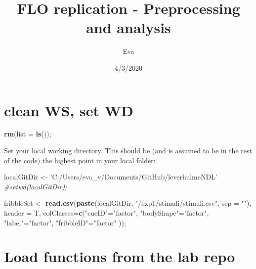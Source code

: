 \documentclass[
]{article}
\title{FLO replication - Preprocessing and analysis}
\author{Eva}
\date{4/3/2020}
\newenvironment{Shaded}{\begin{snugshade}}{\end{snugshade}}
\newcommand{\CommentTok}[1]{\textcolor[rgb]{0.56,0.35,0.01}{\textit{#1}}}
\newcommand{\DataTypeTok}[1]{\textcolor[rgb]{0.13,0.29,0.53}{#1}}
\newcommand{\KeywordTok}[1]{\textcolor[rgb]{0.13,0.29,0.53}{\textbf{#1}}}
\newcommand{\NormalTok}[1]{#1}
\newcommand{\StringTok}[1]{\textcolor[rgb]{0.31,0.60,0.02}{#1}}
\begin{document}
\maketitle

{
\setcounter{tocdepth}{3}
\tableofcontents
}
\hypertarget{clean-ws-set-wd}{%
\section{clean WS, set WD}\label{clean-ws-set-wd}}

\begin{Shaded}
\begin{Highlighting}[]
\KeywordTok{rm}\NormalTok{(}\DataTypeTok{list =} \KeywordTok{ls}\NormalTok{());}
\end{Highlighting}
\end{Shaded}

Set your local working directory. This should be (and is assumed to be
in the rest of the code) the highest point in your local folder:

\begin{Shaded}
\begin{Highlighting}[]
\NormalTok{localGitDir <-}\StringTok{ 'C:/Users/eva_v/Documents/GitHub/leverhulmeNDL'}
\CommentTok{#setwd(localGitDir);}
\end{Highlighting}
\end{Shaded}

\begin{Shaded}
\begin{Highlighting}[]
\NormalTok{fribbleSet <-}\StringTok{ }\KeywordTok{read.csv}\NormalTok{(}\KeywordTok{paste}\NormalTok{(localGitDir, }\StringTok{"/exp1/stimuli/stimuli.csv"}\NormalTok{, }\DataTypeTok{sep =} \StringTok{""}\NormalTok{), }
                       \DataTypeTok{header =}\NormalTok{ T,}
                       \DataTypeTok{colClasses=}\KeywordTok{c}\NormalTok{(}\StringTok{"cueID"}\NormalTok{=}\StringTok{"factor"}\NormalTok{,}
                        \StringTok{"bodyShape"}\NormalTok{=}\StringTok{"factor"}\NormalTok{,}
                        \StringTok{"label"}\NormalTok{=}\StringTok{"factor"}\NormalTok{,}
                        \StringTok{"fribbleID"}\NormalTok{=}\StringTok{"factor"}
\NormalTok{                        ));}
\end{Highlighting}
\end{Shaded}

\hypertarget{load-functions-from-the-lab-repo}{%
\section{Load functions from the lab
repo}\label{load-functions-from-the-lab-repo}}
\end{document}
